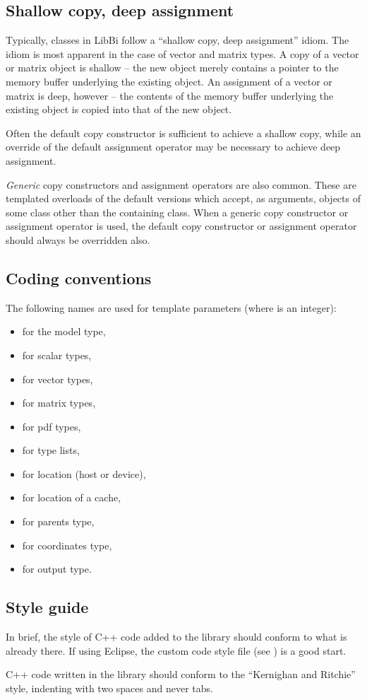 \subsection{Shallow copy, deep assignment}

Typically, classes in LibBi follow a ``shallow copy, deep assignment''
idiom. The idiom is most apparent in the case of vector and matrix types. A
copy of a vector or matrix object is shallow -- the new object merely contains
a pointer to the memory buffer underlying the existing object. An assignment
of a vector or matrix is deep, however -- the contents of the memory buffer
underlying the existing object is copied into that of the new object.

Often the default copy constructor is sufficient to achieve a shallow copy,
while an override of the default assignment operator may be necessary to
achieve deep assignment.

\emph{Generic} copy constructors and assignment operators are also
common. These are templated overloads of the default versions which accept, as
arguments, objects of some class other than the containing class. When a
generic copy constructor or assignment operator is used, the default copy
constructor or assignment operator should always be overridden also.

\subsection{Coding conventions}

The following names are used for template parameters (where  is an
integer):
\begin{itemize}
\item {} for the model type,
\item {} for scalar types,
\item {} for vector types,
\item {} for matrix types,
\item {} for pdf types,
\item {} for type lists,
\item {} for location (host or device),
\item {} for location of a cache,
\item {} for parents type,
\item {} for coordinates type,
\item {} for output type.
\end{itemize}

\subsection{Style guide}

In brief, the style of C++ code added to the library should conform to what is
already there. If using Eclipse, the custom code style file (see
) is a good start.

C++ code written in the library should conform to the ``Kernighan and Ritchie''
style, indenting with two spaces and never tabs.
